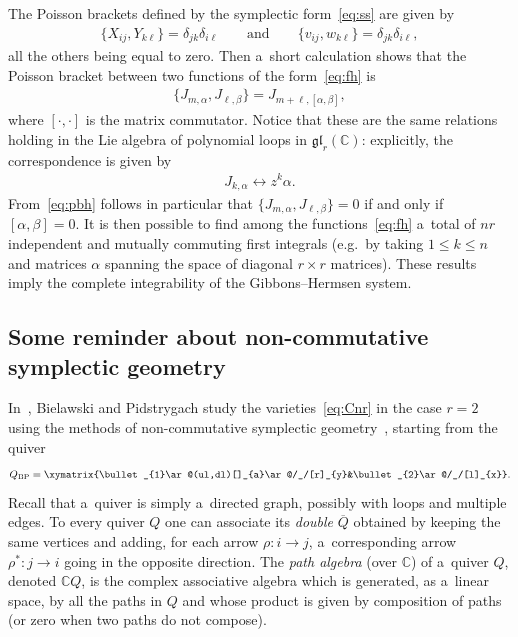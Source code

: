 \documentclass[pdftex]{sigma}
\newcommand{\bb}[1]{\mathbb{#1}}
\newcommand{\app}[3]{#1\colon #2\to #3}
\newcommand{\ol}[1]{\overline{#1}}
\begin{document}
The Poisson brackets def\/ined by the symplectic form~\eqref{eq:ss} are given by
\begin{gather*}%
\{X_{ij},Y_{k\ell}\}=\delta_{jk}\delta_{i\ell}
\qquad
\text{and}
\qquad
\{v_{ij},w_{k\ell}\}=\delta_{jk}\delta_{i\ell},
\end{gather*}
all the others being equal to zero.
Then a~short calculation shows that the Poisson bracket between two functions of the form~\eqref{eq:fh} is
\begin{gather}
\label{eq:pbh}
\{J_{m,\alpha},J_{\ell,\beta}\}=J_{m+\ell,[\alpha,\beta]},
\end{gather}
where $[\cdot,\cdot]$ is the matrix commutator.
Notice that these are the same relations holding in the Lie algebra of polynomial loops in
$\mathfrak{gl}_r(\bb{C})$: explicitly, the correspondence is given by
\begin{gather}
\label{eq:corr}
J_{k,\alpha}\leftrightarrow z^{k}\alpha.
\end{gather}
From~\eqref{eq:pbh} follows in particular that \(\{J_{m,\alpha}, J_{\ell,\beta}\} = 0\) if and only if
\([\alpha,\beta] = 0\).
It is then possible to f\/ind among the functions~\eqref{eq:fh} a~total of \(nr\) independent and mutually
commuting f\/irst integrals (e.g.\
by taking \(1\leq k\leq n\) and matrices \(\alpha\) spanning the space of diagonal \(r\times r\) matrices).
These results imply the complete integrability of the Gibbons--Hermsen system.

\subsection{Some reminder about non-commutative symplectic geometry}

In~\cite{bp08}, Bielawski and Pidstrygach study the varieties~\eqref{eq:Cnr} in the case \(r=2\) using the methods
of non-commutative symplectic geometry~\cite{blb02, ginz01}, starting from the quiver
\begin{gather}
\label{eq:quiv-bp}
Q_{\mathrm{BP}}=\xymatrix{\bullet_{1}\ar@(ul,dl)[]_{a}\ar@/_/[r]_{y}&\bullet_{2}\ar@/_/[l]_{x}}.
\end{gather}
Recall that a~quiver is simply a~directed graph, possibly with loops and multiple edges.
To every quiver \(Q\) one can associate its \emph{double} \(\ol{Q}\) obtained by keeping the same vertices
and adding, for each arrow \(\app{\rho}{i}{j}\), a~corresponding arrow \(\app{\rho^{*}}{j}{i}\) going in
the opposite direction.
The \emph{path algebra} (over \(\bb{C}\)) of a~quiver \(Q\), denoted \(\bb{C}Q\), is the complex
associative algebra which is generated, as a~linear space, by all the paths in \(Q\) and whose product is
given by composition of paths (or zero when two paths do not compose).
\end{document}
